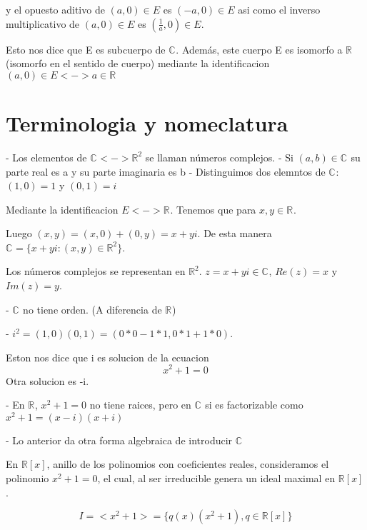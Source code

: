 y el opuesto aditivo de \( (a,0) \in E\) es \( (-a,0) \in E\) asi como el inverso multiplicativo de  \( (a,0) \in E\) es \( (\frac{1}{a},0) \in E\).

Esto nos dice que E es subcuerpo de \(\mathbb{C}^{}\). Además, este cuerpo E es isomorfo a \(\mathbb{R}^{}\) (isomorfo en el sentido de cuerpo) mediante la identificacion \((a,0) \in E <-> a \in \mathbb{R}^{}\) %

\section{Terminologia y nomeclatura}

- Los elementos de \(\mathbb{C}^{} <-> \mathbb{R}^{2}\) se llaman números complejos.
- Si \((a,b) \in \mathbb{C}^{} \) su parte real es a y su parte imaginaria es b
- Distinguimos dos elemntos de \(\mathbb{C}^{}\): \((1,0) = 1\) y \((0,1) = i\)

Mediante la identificacion \( E <-> \mathbb{R}^{}\). Tenemos que para \(x,y \in \mathbb{R}^{}\).


Luego \((x,y) = (x,0)+(0,y) = x + yi\).
De esta manera \(\mathbb{C}^{} = \{x+yi : (x,y) \in \mathbb{R}^{2}\}\).

Los números complejos se representan en \(\mathbb{R}^{2}\).
\(z = x+yi \in \mathbb{C}^{}\), \(Re(z) = x\) y \(Im(z) = y\).


- \( \mathbb{C}^{}\) no tiene orden. (A diferencia de \(\mathbb{R}^{}\))

- \(i^2 = (1,0)(0,1) = (0*0-1*1, 0*1+1*0)\).

Eston nos dice que i es solucion de la ecuacion
\begin{equation*}
  x^2+1=0
\end{equation*}
Otra solucion es -i.

- En \(\mathbb{R}^{}\), \(x^2+1=0 \) no tiene raices, pero en \(\mathbb{C}^{}\) si es factorizable como \(x^2+1= (x-i)(x+i)\)

- Lo anterior da otra forma algebraica de introducir \(\mathbb{C}^{}\)

En \(\mathbb{R}[x]\), anillo de los polinomios con coeficientes reales, consideramos el polinomio \(x^2+1=0\), el cual, al ser irreducible genera un ideal maximal en  \(\mathbb{R}[x]\).

\[ I = <x^2+1> = \{q(x)(x^2+1), q \in \mathbb{R}[x]\}\]

